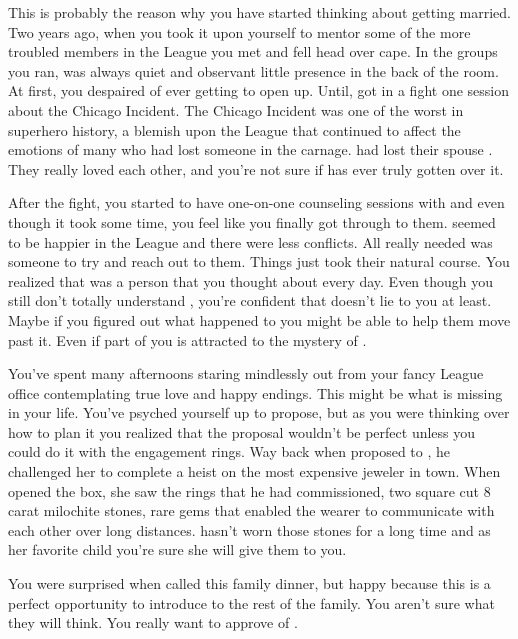 \documentclass[char]{LRSguildcamp1}
\begin{document}
This is probably the reason why you have started thinking about getting married. Two years ago, when you took it upon yourself to mentor some of the more troubled members in the League you met \cYS{} and fell head over cape. In the groups you ran, \cYS{} was always quiet and observant little presence in the back of the room. At first, you despaired of ever getting \cYS{} to open up. Until, \cYS{} got in a fight one session about the Chicago Incident. The Chicago Incident was one of the worst in superhero history, a blemish upon the League that continued to affect the emotions of many who had lost someone in the carnage. \cArchitect{} had lost their spouse \cAS{}. They really loved each other, and you're not sure if \cArchitect{} has ever truly gotten over it. 

After the fight, you started to have one-on-one counseling sessions with \cYS{} and even though it took some time, you feel like you finally got through to them. \cYS{} seemed to be happier in the League and there were less conflicts.  All \cYS{} really needed was someone to try and reach out to them. Things just took their natural course. You realized that \cYS{} was a person that you thought about every day. Even though you still don't totally understand  \cYS {\them}, you're confident that \cYS{} doesn't lie to you at least.  Maybe if you figured out what happened to \cYS{} you might be able to help them move past it.  Even if part of you is attracted to the mystery of \cYS{}. 
 
You've spent many afternoons staring mindlessly out from your fancy League office contemplating true love and happy endings. This might be what is missing in your life. You've psyched yourself up to propose, but as you were thinking over how to plan it you realized that the proposal wouldn't be perfect unless you could do it with the engagement rings. Way back when \cGS{} proposed to \cGrandma{}, he challenged her to complete a heist on the most expensive jeweler in town. When \cGrandma{} opened the box, she saw the rings that he had commissioned, two square cut 8 carat milochite stones, rare gems that enabled the wearer to communicate with each other over long distances. \cGrandma{} hasn't worn those stones for a long time and as her favorite child you're sure she will give them to you. 

You were surprised when \cGrandma{} called this family dinner, but happy because this is a perfect opportunity to introduce \cYS{} to the rest of the family. You aren't sure what they will think. You really want \cGrandma{} to approve of \cYS{}. 
\end{document}

